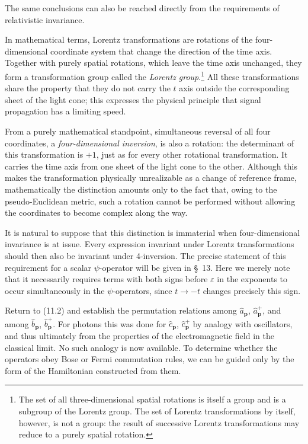The same conclusions can also be reached directly from the requirements of relativistic invariance.

In mathematical terms, Lorentz transformations are rotations of the four-dimensional coordinate system that change the direction of the time axis. Together with purely spatial rotations, which leave the time axis unchanged, they form a transformation group called the \emph{Lorentz group}.\footnote{The set of all three-dimensional spatial rotations is itself a group and is a subgroup of the Lorentz group. The set of Lorentz transformations by itself, however, is not a group: the result of successive Lorentz transformations may reduce to a purely spatial rotation.} All these transformations share the property that they do not carry the $t$ axis outside the corresponding sheet of the light cone; this expresses the physical principle that signal propagation has a limiting speed.

From a purely mathematical standpoint, simultaneous reversal of all four coordinates, a \emph{four-dimensional inversion}, is also a rotation: the determinant of this transformation is $+1$, just as for every other rotational transformation. It carries the time axis from one sheet of the light cone to the other. Although this makes the transformation physically unrealizable as a change of reference frame, mathematically the distinction amounts only to the fact that, owing to the pseudo-Euclidean metric, such a rotation cannot be performed without allowing the coordinates to become complex along the way.

It is natural to suppose that this distinction is immaterial when four-dimensional invariance is at issue. Every expression invariant under Lorentz transformations should then also be invariant under 4-inversion. The precise statement of this requirement for a scalar $\psi$-operator will be given in \S~13. Here we merely note that it necessarily requires terms with both signs before $\varepsilon$ in the exponents to occur simultaneously in the $\psi$-operators, since $t\to-t$ changes precisely this sign.

Return to (11.2) and establish the permutation relations among $\widehat a_{\mathbf p}$, $\widehat a^+_{\mathbf p}$, and among $\widehat b_{\mathbf p}$, $\widehat b^+_{\mathbf p}$. For photons this was done for $\widehat c_{\mathbf p}$, $\widehat c^+_{\mathbf p}$ by analogy with oscillators, and thus ultimately from the properties of the electromagnetic field in the classical limit. No such analogy is now available. To determine whether the operators obey Bose or Fermi commutation rules, we can be guided only by the form of the Hamiltonian constructed from them.

